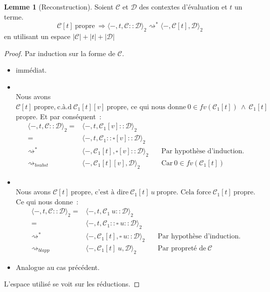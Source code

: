 \documentclass[11pt,a4paper]{article}
\theoremstyle{definition}
\newtheorem{lemma}[theorem]{Lemme}
\newcommand{\mcd}{\mathcal{D}}
\newcommand{\mcc}{\mathcal{C}}
\begin{document}
\begin{lemma}[Reconstruction]
  \label{lemmaportugal}
  Soient $\mathcal{C}$ et $\mathcal{D}$ des contextes d'évaluation et $t$ un terme.
  \[\mathcal{C}[t]~\text{propre}~\Rightarrow \langle-,t,\mathcal{C}::\mathcal{D}\rangle_2 \rightsquigarrow^* \langle-,\mathcal{C}[t],\mathcal{D}\rangle_2\]
en utilisant un espace $|\mcc|+|t|+|\mcd|$
\end{lemma}
\begin{proof}
  Par induction sur la forme de $\mathcal{C}$.
  \begin{itemize}
    \item {} immédiat.
    \item {}\\
      Nous avons
       $ \mathcal{C}[t]~\text{propre,}~\text{c.à.d}~\mathcal{C}_1[t][v]~\text{propre, ce qui nous donne}~0\in fv(\mathcal{C}_1[t])~\wedge~\mathcal{C}_1[t]~$propre.
      Et par conséquent~:
      \begin{align*}
        \langle -, t, \mathcal{C} :: \mathcal{D}\rangle_2 = &\langle -, t, \mathcal{C}_1[v]:: \mathcal{D}\rangle_2 \\
        = &\langle -, t, \mathcal{C}_1:: \square[v] :: \mathcal{D}\rangle_2 \\
        \rightsquigarrow^* &\langle -, \mathcal{C}_1[t], \square[v]:: \mathcal{D}\rangle_2 \quad &\text{Par hypothèse d'induction.}\\
        \rightsquigarrow_{bsubst} &\langle -, \mathcal{C}_1[t][v], \mathcal{D}\rangle_2 \quad &\text{Car}~0\in fv(\mathcal{C}_1[t])
      \end{align*}
    \item {}\\
      Nous avons $\mathcal{C}[t]~\text{propre, c'est à dire}~\mathcal{C}_1[t]~u~\text{propre. Cela force}~\mathcal{C}_1[t]~$propre.
      Ce qui nous donne~:
      \begin{align*}
        \langle -, t, \mathcal{C} :: \mathcal{D}\rangle_2 = &\langle -, t, \mathcal{C}_1~u:: \mathcal{D}\rangle_2 \\
        = &\langle -, t, \mathcal{C}_1:: \square~u :: \mathcal{D}\rangle_2 \\
        \rightsquigarrow^* &\langle -, \mathcal{C}_1[t], \square~u:: \mathcal{D}\rangle_2 \quad &\text{Par hypothèse d'induction.}\\
        \rightsquigarrow_{blapp} &\langle -, \mathcal{C}_1[t]~u, \mathcal{D}\rangle_2 \quad &\text{Par propreté de}~\mathcal{C}
      \end{align*}
    \item {} Analogue au cas précédent.
  \end{itemize}
  L'espace utilisé se voit sur les réductions.
\end{proof}
\end{document}
